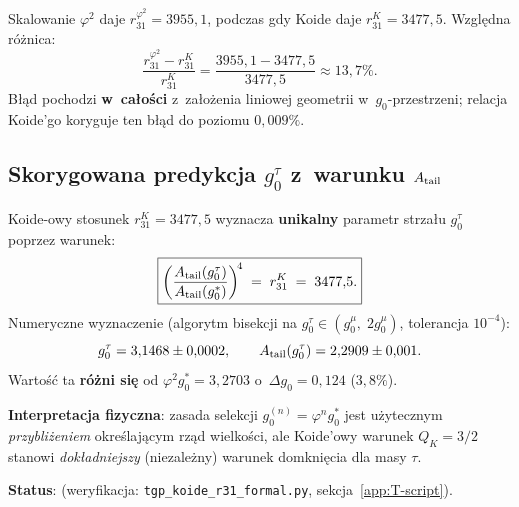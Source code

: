 \begin{corollary}%
\label{cor:T-phi2-error}
Skalowanie $\varphi^2$ daje $r_{31}^{\varphi^2} = 3955{,}1$, podczas
gdy Koide daje $r_{31}^K = 3477{,}5$.
Wzgl\k{e}dna ró\.znica:
\begin{equation}
  \frac{r_{31}^{\varphi^2} - r_{31}^K}{r_{31}^K}
    = \frac{3955{,}1 - 3477{,}5}{3477{,}5} \approx 13{,}7\%.
\end{equation}
B\l\k{a}d pochodzi \textbf{w~ca\l{}o\'sci} z~za\l{}o\.zenia liniowej
geometrii w~$g_0$-przestrzeni; relacja Koide'go koryguje ten b\l\k{a}d
do poziomu $0{,}009\%$.
\end{corollary}

\subsection{Skorygowana predykcja $g_0^\tau$ z~warunku $A_{\rm tail}$}%
\label{app:T-g0tau}

\begin{proposition}%
\label{prop:T-g0tau-corrected}
Koide-owy stosunek $r_{31}^K = 3477{,}5$ wyznacza \textbf{unikalny}
parametr strzału $g_0^\tau$ poprzez warunek:
\begin{equation}\label{eq:T-g0tau-cond}
  \boxed{\left(\frac{A_{\rm tail}(g_0^\tau)}{A_{\rm tail}(g_0^*)}\right)^{\!4}
    \;=\; r_{31}^K \;=\; 3477{,}5.}
\end{equation}
Numeryczne wyznaczenie (algorytm bisekcji na
$g_0^\tau \in (g_0^\mu,\; 2g_0^\mu)$, tolerancja $10^{-4}$):
\begin{equation}\label{eq:T-g0tau-val}
  g_0^\tau = 3{,}1468 \pm 0{,}0002,
  \qquad
  A_{\rm tail}(g_0^\tau) = 2{,}2909 \pm 0{,}001.
\end{equation}
Wartość ta \textbf{różni się} od $\varphi^2 g_0^* = 3{,}2703$
o~$\Delta g_0 = 0{,}124$ ($3{,}8\%$).

\textbf{Interpretacja fizyczna}: zasada selekcji
$g_0^{(n)} = \varphi^n g_0^*$ jest u\.zytecznym \textit{przybli\.zeniem}
okre\'slaj\k{a}cym rz\k{a}d wielko\'sci, ale Koide'owy warunek
$Q_K = 3/2$ stanowi \emph{dok\l{}adniejszy} (niezale\.zny) warunek
domkni\k{e}cia dla masy $\tau$.

\textbf{Status}: 
(weryfikacja: \texttt{tgp\_koide\_r31\_formal.py},
sekcja~\ref{app:T-script}).
\end{proposition}

